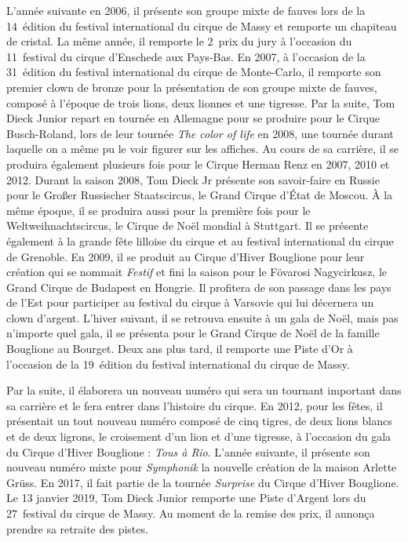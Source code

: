L'année suivante en 2006, il présente son groupe mixte de fauves lors de la 14\ieme~édition du festival international du cirque de Massy et remporte un chapiteau de cristal. La même année, il remporte le 2\ieme~prix du jury à l'occasion du 11\ieme~festival du cirque d'Enschede aux Pays-Bas. En 2007, à l'occasion de la 31\ieme~édition du festival international du cirque de Monte-Carlo, il remporte son premier clown de bronze pour la présentation de son groupe mixte de fauves, composé à l'époque de trois lions, deux lionnes et une tigresse. Par la suite, Tom Dieck Junior repart en tournée en Allemagne pour se produire pour le Cirque Busch-Roland, lors de leur tournée \textit{The color of life} en 2008, une tournée durant laquelle on a même pu le voir figurer sur les affiches. Au cours de sa carrière, il se produira également plusieurs fois pour le Cirque Herman Renz en 2007, 2010 et 2012. Durant la saison 2008, Tom Dieck Jr présente son savoir-faire en Russie pour le Großer Russischer Staatscircus, le Grand Cirque d'État de Moscou. À la même époque, il se produira aussi pour la première fois pour le Weltweihnachtscircus, le Cirque de Noël mondial à Stuttgart. Il se présente également à la grande fête lilloise du cirque et au festival international du cirque de Grenoble. En 2009, il se produit au Cirque d'Hiver Bouglione pour leur création qui se nommait \textit{Festif} et fini la saison pour le Fövarosi Nagycirkusz, le Grand Cirque de Budapest en Hongrie. Il profitera de son passage dans les pays de l'Est pour participer au festival du cirque à Varsovie qui lui décernera un clown d'argent. L'hiver suivant, il se retrouva ensuite à un gala de Noël, mais pas n'importe quel gala, il se présenta pour le Grand Cirque de Noël de la famille Bouglione au Bourget. Deux ans plus tard, il remporte une Piste d'Or à l'occasion de la 19\ieme~édition du festival international du cirque de Massy.

Par la suite, il élaborera un nouveau numéro qui sera un tournant important dans sa carrière et le fera entrer dans l'histoire du cirque. En 2012, pour les fêtes, il présentait un tout nouveau numéro composé de cinq tigres, de deux lions blancs et de deux ligrons, le croisement d’un lion et d’une tigresse, à l'occasion du gala du Cirque d'Hiver Bouglione : \textit{Tous à Rio}. L'année suivante, il présente son nouveau numéro mixte pour \textit{Symphonik} la nouvelle création de la maison Arlette Grüss. En 2017, il fait partie de la tournée \textit{Surprise} du Cirque d'Hiver Bouglione. Le 13 janvier 2019, Tom Dieck Junior remporte une Piste d’Argent lors du 27\ieme~festival du cirque de Massy. Au moment de la remise des prix, il annonça prendre sa retraite des pistes.

